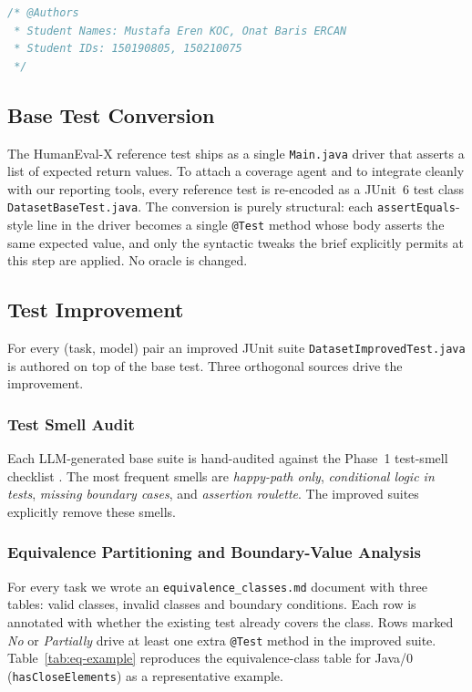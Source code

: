 \documentclass[journal]{IEEEtran}
\begin{document}
\begin{lstlisting}[language=Java, caption=Required header block prepended to every generated solution and test file.]
/* @Authors
 * Student Names: Mustafa Eren KOC, Onat Baris ERCAN
 * Student IDs: 150190805, 150210075
 */
\end{lstlisting}

\subsection{Base Test Conversion}

The HumanEval-X reference test ships as a single \texttt{Main.java} driver
that asserts a list of expected return values. To attach a coverage agent
and to integrate cleanly with our reporting tools, every reference test is
re-encoded as a JUnit~6 test class \texttt{DatasetBaseTest.java}. The
conversion is purely structural: each \texttt{assertEquals}-style line in
the driver becomes a single \texttt{@Test} method whose body asserts the
same expected value, and only the syntactic tweaks the brief explicitly
permits at this step are applied. No oracle is changed.

\subsection{Test Improvement}\label{sec:improved}

For every (task, model) pair an improved JUnit suite
\texttt{DatasetImprovedTest.java} is authored on top of the base test.
Three orthogonal sources drive the improvement.

\subsubsection{Test Smell Audit}

Each LLM-generated base suite is hand-audited against the Phase~1
test-smell checklist \cite{jnose}. The most frequent smells are
\emph{happy-path only}, \emph{conditional logic in tests}, \emph{missing
boundary cases}, and \emph{assertion roulette}. The improved suites
explicitly remove these smells.

\subsubsection{Equivalence Partitioning and Boundary-Value Analysis}

For every task we wrote an \texttt{equivalence\_classes.md} document with
three tables: valid classes, invalid classes and boundary conditions. Each
row is annotated with whether the existing test already covers the class.
Rows marked \emph{No} or \emph{Partially} drive at least one extra
\texttt{@Test} method in the improved suite. Table~\ref{tab:eq-example}
reproduces the equivalence-class table for Java/0
(\texttt{hasCloseElements}) as a representative example.
\end{document}
